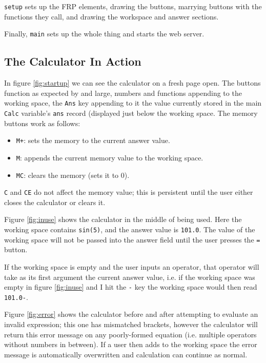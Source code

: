 \documentclass[12pt]{article}
\begin{document}


\verb|setup| sets up the FRP elements, drawing the buttons, marrying buttons with the functions they call, and drawing the workspace and answer sections.



Finally, \verb|main| sets up the whole thing and starts the web server.

\subsection{The Calculator In Action}

In figure \ref{fig:startup} we can see the calculator on a fresh page open.
The buttons function as expected by and large, numbers and functions appending to the working space, the \verb|Ans| key appending to it the value currently stored in the main \verb|Calc| variable's \verb|ans| record (displayed just below the working space.
The memory buttons work as follows:
\begin{itemize}
  \item \verb|M+|: sets the memory to the current answer value.
  \item \verb|M|: appends the current memory value to the working space.
  \item \verb|MC|: clears the memory (sets it to 0).
\end{itemize}

\verb|C| and \verb|CE| do not affect the memory value; this is persistent until the user either closes the calculator or clears it.

Figure \ref{fig:inuse} shows the calculator in the middle of being used.
Here the working space contains \verb|sin(5)|, and the answer value is \verb|101.0|.
The value of the working space will not be passed into the answer field until the user presses the \verb|=| button.

If the working space is empty and the user inputs an operator, that operator will take as its first argument the current answer value, i.e. if the working space was empty in figure \ref{fig:inuse} and I hit the \verb|-| key the working space would then read \verb|101.0-|.

Figure \ref{fig:error} shows the calculator before and after attempting to evaluate an invalid expression; this one has mismatched brackets, however the calculator will return this error message on any poorly-formed equation (i.e. multiple operators without numbers in between).
If a user then adds to the working space the error message is automatically overwritten and calculation can continue as normal.
\end{document}
